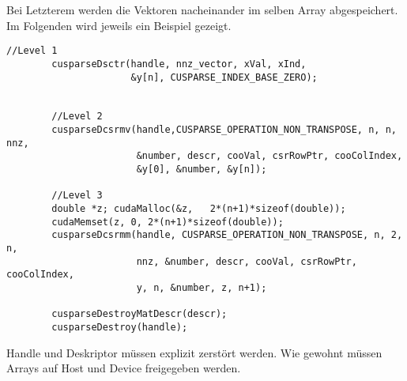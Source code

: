 		Bei Letzterem werden die Vektoren nacheinander im selben Array abgespeichert. Im Folgenden wird jeweils ein Beispiel gezeigt. 
		
		\begin{lstlisting}[caption=cuSPARSE: Beispiele und Cleanup]
		//Level 1
		cusparseDsctr(handle, nnz_vector, xVal, xInd, 
		              &y[n], CUSPARSE_INDEX_BASE_ZERO);


		//Level 2
		cusparseDcsrmv(handle,CUSPARSE_OPERATION_NON_TRANSPOSE, n, n, nnz,
		               &number, descr, cooVal, csrRowPtr, cooColIndex, 
		               &y[0], &number, &y[n]);

		//Level 3
		double *z; cudaMalloc(&z,   2*(n+1)*sizeof(double));
		cudaMemset(z, 0, 2*(n+1)*sizeof(double));
		cusparseDcsrmm(handle, CUSPARSE_OPERATION_NON_TRANSPOSE, n, 2, n,
		               nnz, &number, descr, cooVal, csrRowPtr, cooColIndex, 
		               y, n, &number, z, n+1);
               
		cusparseDestroyMatDescr(descr);
		cusparseDestroy(handle);
		\end{lstlisting}

		\Gls{Handle} und Deskriptor müssen explizit zerstört werden. Wie gewohnt müssen Arrays auf Host und Device freigegeben werden.

